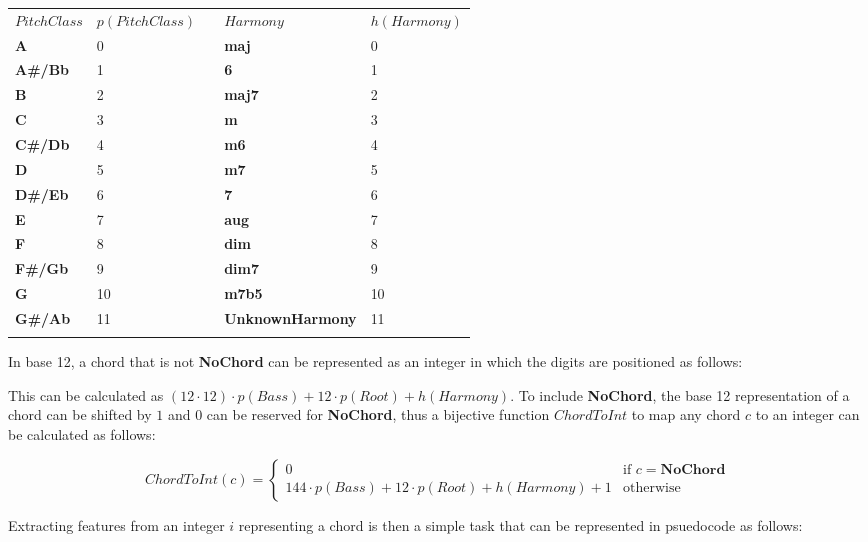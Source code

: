 \begin{tabular}{llcll}
$PitchClass$ & $p(PitchClass)$ & \hspace*{2cm} & $Harmony$ & $h(Harmony)$ \\
\cmidrule(r){1-2} \cmidrule(r){4-5}
\textbf{A}     & 0  & & \textbf{maj} & 0 \\
\textbf{A#/Bb} & 1  & & \textbf{6} & 1 \\
\textbf{B}     & 2  & & \textbf{maj7} & 2 \\
\textbf{C}     & 3  & & \textbf{m} & 3 \\
\textbf{C#/Db} & 4  & & \textbf{m6} & 4 \\
\textbf{D}     & 5  & & \textbf{m7} & 5 \\
\textbf{D#/Eb} & 6  & & \textbf{7} & 6 \\
\textbf{E}     & 7  & & \textbf{aug} & 7 \\
\textbf{F}     & 8  & & \textbf{dim} & 8 \\
\textbf{F#/Gb} & 9  & & \textbf{dim7} & 9 \\
\textbf{G}     & 10 & & \textbf{m7b5} & 10 \\
\textbf{G#/Ab} & 11 & & \textbf{UnknownHarmony} & 11 \\ \\
\end{tabular}

In base 12, a chord that is not \textbf{NoChord} can be represented as an integer in which the digits are positioned as follows:

\begin{center}
\end{center}

This can be calculated as $(12 \cdot 12) \cdot p(Bass) + 12 \cdot p(Root) + h(Harmony)$. To include \textbf{NoChord}, the base 12 representation of a chord can be shifted by $1$ and $0$ can be reserved for \textbf{NoChord}, thus a bijective function $ChordToInt$ to map any chord $c$ to an integer can be calculated as follows:

\[
ChordToInt(c) = 
\begin{cases}
0 & \text{if }c = \textbf{NoChord} \\
144 \cdot p(Bass) + 12 \cdot p(Root) + h(Harmony) + 1 & \text{otherwise}
\end{cases}
\]


Extracting features from an integer $i$ representing a chord is then a simple task that can be represented in psuedocode as follows:

